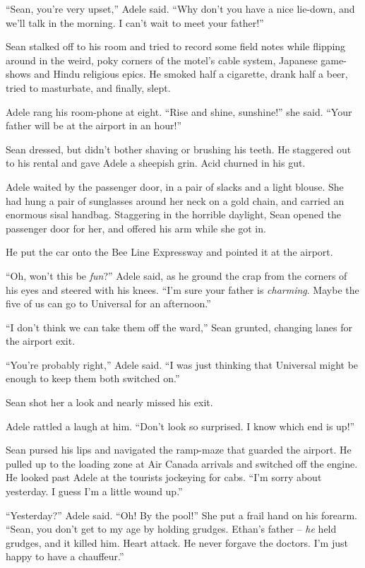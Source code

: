 “Sean, you're very upset,” Adele said. “Why don't you have a nice 
lie-down, and we'll talk in the morning. I can't wait to meet your 
father!”

Sean stalked off to his room and tried to record some field notes while 
flipping around in the weird, poky corners of the motel's cable system, 
Japanese game-shows and Hindu religious epics. He smoked half a 
cigarette, drank half a beer, tried to masturbate, and finally, slept.

\tb

Adele rang his room-phone at eight. “Rise and shine, sunshine!” she 
said. “Your father will be at the airport in an hour!”

Sean dressed, but didn't bother shaving or brushing his teeth. He 
staggered out to his rental and gave Adele a sheepish grin. Acid 
churned in his gut.

Adele waited by the passenger door, in a pair of slacks and a light 
blouse. She had hung a pair of sunglasses around her neck on a gold 
chain, and carried an enormous sisal handbag. Staggering in the 
horrible daylight, Sean opened the passenger door for her, and offered 
his arm while she got in.

He put the car onto the Bee Line Expressway and pointed it at the 
airport.

“Oh, won't this be \emph{fun}?” Adele said, as he ground the crap 
from the corners of his eyes and steered with his knees. “I'm sure 
your father is \emph{charming}. Maybe the five of us can go to 
Universal for an afternoon.”

“I don't think we can take them off the ward,” Sean grunted, 
changing lanes for the airport exit.

“You're probably right,” Adele said. “I was just thinking that 
Universal might be enough to keep them both switched on.”

Sean shot her a look and nearly missed his exit.

Adele rattled a laugh at him. “Don't look so surprised. I know which 
end is up!”

Sean pursed his lips and navigated the ramp-maze that guarded the 
airport. He pulled up to the loading zone at Air Canada arrivals and 
switched off the engine. He looked past Adele at the tourists jockeying 
for cabs. “I'm sorry about yesterday. I guess I'm a little wound 
up.”

“Yesterday?” Adele said. “Oh! By the pool!” She put a frail 
hand on his forearm. “Sean, you don't get to my age by holding 
grudges. Ethan's father -- \emph{he} held grudges, and it killed him. 
Heart attack. He never forgave the doctors. I'm just happy to have a 
chauffeur.”


